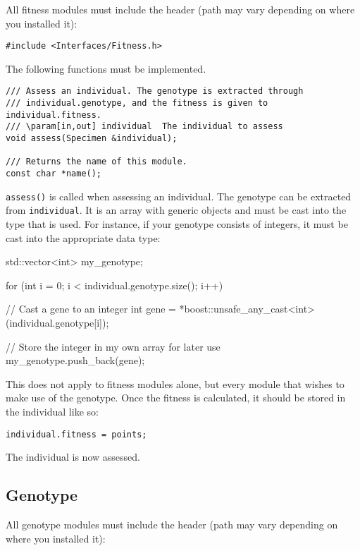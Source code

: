 All fitness modules must include the header (path may vary depending on where you installed it):

\begin{verbatim}
#include <Interfaces/Fitness.h>
\end{verbatim}

\noindent The following functions must be implemented.

\begin{verbatim}
/// Assess an individual. The genotype is extracted through
/// individual.genotype, and the fitness is given to individual.fitness.
/// \param[in,out] individual  The individual to assess
void assess(Specimen &individual);

/// Returns the name of this module.
const char *name();
\end{verbatim}

\noindent \texttt{assess()} is called when assessing an individual. The genotype can be extracted from \texttt{individual}. It is an array with generic objects and must be cast into the type that is used. For instance, if your genotype consists of integers, it must be cast into the appropriate data type:

\begin{verbatimtab}
std::vector<int> my_genotype;

for (int i = 0; i < individual.genotype.size(); i++)
{
	// Cast a gene to an integer
	int gene = *boost::unsafe_any_cast<int>(individual.genotype[i]);

	// Store the integer in my own array for later use
	my_genotype.push_back(gene);
}
\end{verbatimtab}

\noindent This does not apply to fitness modules alone, but every module that wishes to make use of the genotype. Once the fitness is calculated, it should be stored in the individual like so:

\begin{verbatim}
individual.fitness = points;
\end{verbatim}

\noindent The individual is now assessed.


\subsection{Genotype}

All genotype modules must include the header (path may vary depending on where you installed it):


